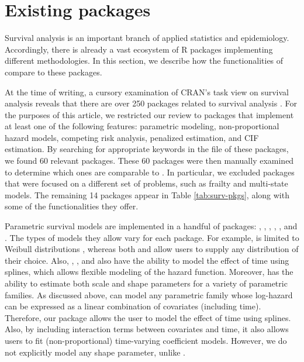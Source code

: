 \hypertarget{existing-packages}{%
\section{Existing packages}\label{existing-packages}}

Survival analysis is an important branch of applied statistics and
epidemiology. Accordingly, there is already a vast ecosystem of
\textsf{R} packages implementing different methodologies. In this
section, we describe how the functionalities of  compare
to these packages.

At the time of writing, a cursory examination of CRAN's task view on
survival analysis reveals that there are over 250 packages related to
survival analysis \citep{survTaskView}. For the purposes of this
article, we restricted our review to packages that implement at least
one of the following features: parametric modeling, non-proportional
hazard models, competing risk analysis, penalized estimation, and CIF
estimation. By searching for appropriate keywords in the
 file of these packages, we found 60 relevant
packages. These 60 packages were then manually examined to determine
which ones are comparable to . In particular, we excluded
packages that were focused on a different set of problems, such as
frailty and multi-state models. The remaining 14 packages appear in
Table \ref{tab:surv-pkgs}, along with some of the functionalities they
offer.

Parametric survival models are implemented in a handful of packages:
 \citeyearpar{mahani2015bayesian}, 
\citeyearpar{flexsurv},  \citeyearpar{smoothHazard},
 \citeyearpar{clements_liu}, 
\citeyearpar{scheike2014estimating}, and 
\citeyearpar{survival-package}. The types of models they allow vary for
each package. For example,  is limited to Weibull
distributions \citeyearpar{smoothHazard}, whereas both 
and  allow users to supply any distribution of their
choice. Also, , ,  and
 also have the ability to model the effect of time using
splines, which allows flexible modeling of the hazard function.
Moreover,  has the ability to estimate both scale and
shape parameters for a variety of parametric families. As discussed
above,  can model any parametric family whose log-hazard
can be expressed as a linear combination of covariates (including time).
Therefore, our package allows the user to model the effect of time using
splines. Also, by including interaction terms between covariates and
time, it also allows users to fit (non-proportional) time-varying
coefficient models. However, we do not explicitly model any shape
parameter, unlike .

